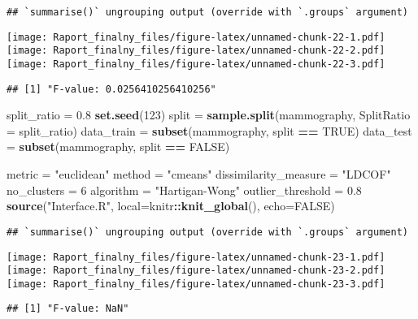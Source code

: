 \documentclass[
]{article}
\newenvironment{Shaded}{\begin{snugshade}}{\end{snugshade}}
\newcommand{\DataTypeTok}[1]{\textcolor[rgb]{0.13,0.29,0.53}{#1}}
\newcommand{\DecValTok}[1]{\textcolor[rgb]{0.00,0.00,0.81}{#1}}
\newcommand{\FloatTok}[1]{\textcolor[rgb]{0.00,0.00,0.81}{#1}}
\newcommand{\KeywordTok}[1]{\textcolor[rgb]{0.13,0.29,0.53}{\textbf{#1}}}
\newcommand{\NormalTok}[1]{#1}
\newcommand{\OperatorTok}[1]{\textcolor[rgb]{0.81,0.36,0.00}{\textbf{#1}}}
\newcommand{\OtherTok}[1]{\textcolor[rgb]{0.56,0.35,0.01}{#1}}
\newcommand{\StringTok}[1]{\textcolor[rgb]{0.31,0.60,0.02}{#1}}
\begin{document}
\begin{verbatim}
## `summarise()` ungrouping output (override with `.groups` argument)
\end{verbatim}

\texttt{[image: Raport\_finalny\_files/figure-latex/unnamed-chunk-22-1.pdf]}
\texttt{[image: Raport\_finalny\_files/figure-latex/unnamed-chunk-22-2.pdf]}
\texttt{[image: Raport\_finalny\_files/figure-latex/unnamed-chunk-22-3.pdf]}

\begin{verbatim}
## [1] "F-value: 0.0256410256410256"
\end{verbatim}

\begin{Shaded}
\begin{Highlighting}[]
\NormalTok{split_ratio =}\StringTok{ }\FloatTok{0.8}
\KeywordTok{set.seed}\NormalTok{(}\DecValTok{123}\NormalTok{)}
\NormalTok{split =}\StringTok{ }\KeywordTok{sample.split}\NormalTok{(mammography, }\DataTypeTok{SplitRatio =}\NormalTok{ split_ratio)}
\NormalTok{data_train =}\StringTok{ }\KeywordTok{subset}\NormalTok{(mammography, split }\OperatorTok{==}\StringTok{ }\OtherTok{TRUE}\NormalTok{)}
\NormalTok{data_test =}\StringTok{ }\KeywordTok{subset}\NormalTok{(mammography, split }\OperatorTok{==}\StringTok{ }\OtherTok{FALSE}\NormalTok{)}

\NormalTok{metric =}\StringTok{ "euclidean"}
\NormalTok{method =}\StringTok{ "cmeans"}
\NormalTok{dissimilarity_measure =}\StringTok{ "LDCOF"}
\NormalTok{no_clusters =}\StringTok{ }\DecValTok{6}
\NormalTok{algorithm =}\StringTok{ "Hartigan-Wong"}
\NormalTok{outlier_threshold =}\StringTok{ }\FloatTok{0.8}
\KeywordTok{source}\NormalTok{(}\StringTok{"Interface.R"}\NormalTok{, }\DataTypeTok{local=}\NormalTok{knitr}\OperatorTok{::}\KeywordTok{knit_global}\NormalTok{(), }\DataTypeTok{echo=}\OtherTok{FALSE}\NormalTok{)}
\end{Highlighting}
\end{Shaded}

\begin{verbatim}
## `summarise()` ungrouping output (override with `.groups` argument)
\end{verbatim}

\texttt{[image: Raport\_finalny\_files/figure-latex/unnamed-chunk-23-1.pdf]}
\texttt{[image: Raport\_finalny\_files/figure-latex/unnamed-chunk-23-2.pdf]}
\texttt{[image: Raport\_finalny\_files/figure-latex/unnamed-chunk-23-3.pdf]}

\begin{verbatim}
## [1] "F-value: NaN"
\end{verbatim}
\end{document}
